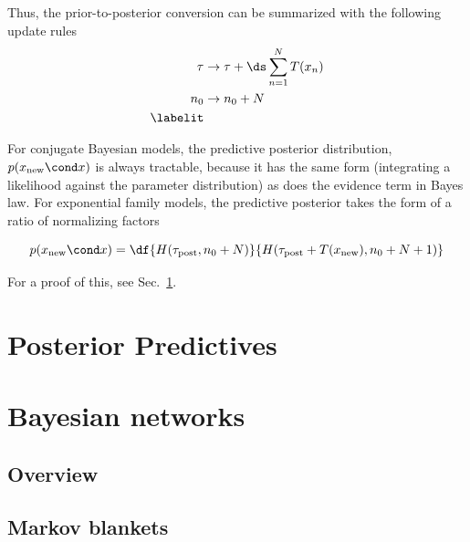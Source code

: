 \documentclass{article} %
\begin{document}
Thus, the prior-to-posterior conversion can be summarized with the following update rules
\begin{align*}
\tau & \to \tau + \ds\sum_{n=1}^N T(x_n) \\
n_0 & \to  n_0 + N \\
\labelit \label{eqn:general_formalism_prior_to_posterior_conversion}
\end{align*}

For conjugate Bayesian models, the predictive posterior distribution, $p(x_{\text{new}} \cond x)$ is always tractable, because it has the same form (integrating a likelihood against the parameter distribution) as does the evidence term in Bayes law.   For exponential family models, the predictive posterior takes the form of a ratio of normalizing factors

\begin{equation}
p(x_{\text{new}} \cond x) = \df{H(\tau_{\text{post}}, n_0 + N)}{H(\tau_{\text{post}} + T(x_{\text{new}}), n_0 + N + 1)}
\label{eqn:predictive_posterior_exptl_family}
\end{equation}

For a proof of this, see Sec.~\ref{sec:posterior_predictives}.


\section{Posterior Predictives} \label{sec:posterior_predictives}



\section{Bayesian networks} \label{sec:bayesian_networks}


\subsection{Overview}





\subsection{Markov blankets} \label{sec:markov_blankets}
\end{document}
